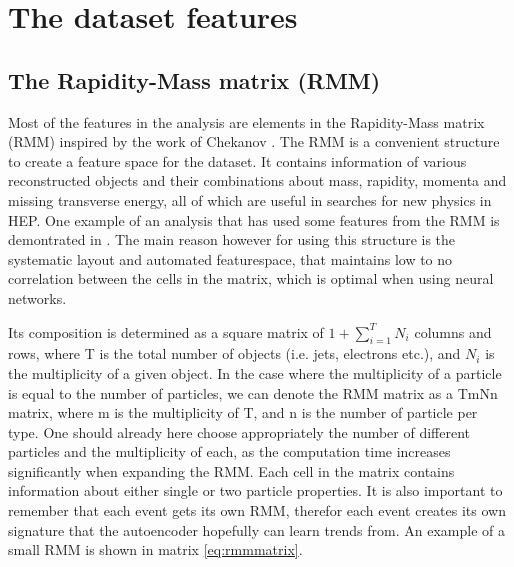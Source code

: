 \section{The dataset features}

\subsection*{The Rapidity-Mass matrix (RMM) }\label{sec:rmm}
Most of the features in the analysis are elements in the Rapidity-Mass matrix (RMM) inspired by the work of Chekanov
\cite{Chekanov_2019}. The RMM is a convenient structure to create a feature space for the dataset. It contains 
information of various reconstructed objects and their combinations about mass, rapidity, momenta and missing transverse 
energy, all of which are useful in searches for new physics\cite{Chekanov_2021} in HEP. One example of an analysis 
that has used some features from the RMM is demontrated in \cite{Santos_2017}. The main reason however for 
using this structure is the systematic layout and automated featurespace, that maintains low to no correlation between 
the cells in the matrix, which is optimal when using neural networks. \par
Its composition is determined as a square matrix of $1 + \sum_{i=1}^{T}N_i$ columns and rows, where T is the total 
number of objects (i.e. jets, electrons etc.), and $N_i$ is the multiplicity of a given object. In the case where the 
multiplicity of a particle is equal to the number of particles, we can denote the RMM matrix as a TmNn matrix, where m 
is the multiplicity of T, and n is the number of particle per type. One should already here choose appropriately 
the number of different particles and the multiplicity of each, as the computation time increases significantly 
when expanding the RMM. Each cell in the matrix contains information about either single or two particle properties. 
It is also important to remember that each event gets its own RMM, therefor each event creates its own signature that 
the autoencoder hopefully can learn trends from. An example of a small RMM is shown in matrix \ref{eq:rmmmatrix}.

